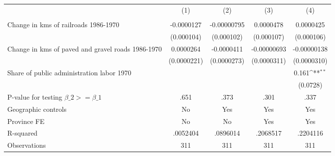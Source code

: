{
\def\sym#1{\ifmmode^{#1}\else\(^{#1}\)\fi}
\begin{tabular}{l*{4}{c}}
\hline\hline
                &\multicolumn{1}{c}{(1)}&\multicolumn{1}{c}{(2)}&\multicolumn{1}{c}{(3)}&\multicolumn{1}{c}{(4)}\\
                &\multicolumn{1}{c}{}&\multicolumn{1}{c}{}&\multicolumn{1}{c}{}&\multicolumn{1}{c}{}\\
\hline
Change in kms of railroads 1986-1970&-0.0000127         &-0.00000795         &0.0000478         &0.0000425         \\
                &(0.000104)         &(0.000102)         &(0.000107)         &(0.000106)         \\
[1em]
Change in kms of paved and gravel roads 1986-1970&0.0000264         &-0.0000411         &-0.00000693         &-0.00000138         \\
                &(0.0000221)         &(0.0000273)         &(0.0000311)         &(0.0000310)         \\
[1em]
Share of public administration labor 1970&                  &                  &                  &    0.161\sym{**} \\
                &                  &                  &                  & (0.0728)         \\
\hline
P-value for testing $\beta\_{2} >= \beta\_{1}$&     .651         &     .373         &     .301         &     .337         \\
Geographic controls&       No         &      Yes         &      Yes         &      Yes         \\
Province FE     &       No         &       No         &      Yes         &      Yes         \\
R-squared       & .0052404         & .0896014         & .2068517         & .2204116         \\
Observations    &      311         &      311         &      311         &      311         \\
\hline\hline
\end{tabular}
}
